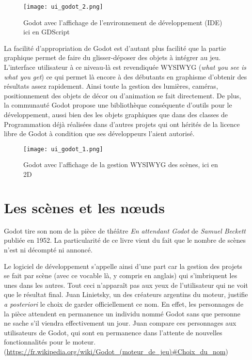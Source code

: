 \documentclass{tstextbook}
\begin{document}
\begin{figure}[h!]
\centering
\texttt{[image: ui\_godot\_2.png]}
\caption{Godot avec l'affichage de l'environnement de développement (IDE) ici en GDScript}
\end{figure}

La facilité d'appropriation de Godot est d'autant plus facilité que la partie graphique permet de faire du glisser-déposer des objets à intégrer au jeu. L'interface utilisateur à ce niveau-là est revendiquée WYSIWYG (\emph{what you see is what you get}) ce qui permet là encore à des débutants en graphisme d'obtenir des résultats assez rapidement. Ainsi toute la gestion des lumières, caméras, positionnement des objets de décor ou d'animation se fait directement. De plus, la communauté Godot propose une bibliothèque conséquente d'outils pour le développement, aussi bien des les objets graphiques que dans des classes de Programmation déjà réalisées dans d'autres projets qui ont hérités de la licence libre de Godot à condition que ses développeurs l'aient autorisé.

\begin{figure}[h!]
\centering
\texttt{[image: ui\_godot\_1.png]}
\caption{Godot avec l'affichage de la gestion WYSIWYG des scènes, ici en 2D}
\end{figure}

\section{Les scènes et les nœuds}

Godot tire son nom de la pièce de théâtre \emph{En attendant Godot} de \emph{Samuel Beckett} publiée en 1952. La particularité de ce livre vient du fait que le nombre de scènes n'est ni décompté ni annoncé.

Le logiciel de développement s'appelle ainsi d'une part car la gestion des projets se fait par scène (avec ce vocable là, y compris en anglais) qui s’imbriquent les unes dans les autres. Tout ceci n'apparaît pas aux yeux de l'utilisateur qui ne voit que le résultat final.
Juan Linietsky, un des créateurs argentins du moteur, justifie \emph{a posteriori} le choix de garder officiellement ce nom. En effet, les personnages de la pièce attendent en permanence un individu nommé Godot sans que personne ne sache s'il viendra effectivement un jour. Juan compare ces personnages aux utilisateurs de Godot, qui sont en permanence dans l'attente de nouvelles fonctionnalités pour le moteur. (\url{https://fr.wikipedia.org/wiki/Godot_(moteur_de_jeu)#Choix_du_nom})
\end{document}
